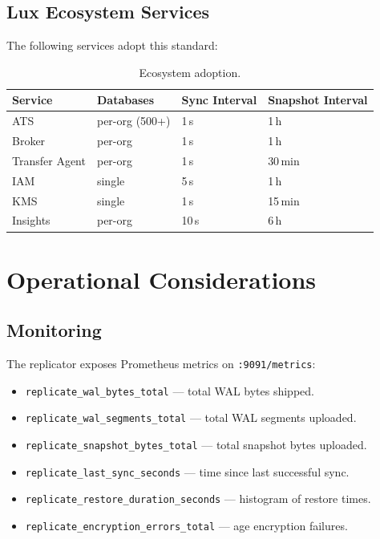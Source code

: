 \documentclass[11pt,a4paper]{article}
\begin{document}
\subsection{Lux Ecosystem Services}

The following services adopt this standard:

\begin{table}[H]
\centering
\caption{Ecosystem adoption.}
\label{tab:adoption}
\begin{tabular}{@{}llll@{}}
\toprule
\textbf{Service} & \textbf{Databases} & \textbf{Sync Interval} &
  \textbf{Snapshot Interval} \\
\midrule
ATS & per-org (500+) & 1\,s & 1\,h \\
Broker & per-org & 1\,s & 1\,h \\
Transfer Agent & per-org & 1\,s & 30\,min \\
IAM & single & 5\,s & 1\,h \\
KMS & single & 1\,s & 15\,min \\
Insights & per-org & 10\,s & 6\,h \\
\bottomrule
\end{tabular}
\end{table}

\section{Operational Considerations}\label{sec:ops}

\subsection{Monitoring}

The replicator exposes Prometheus metrics on \texttt{:9091/metrics}:

\begin{itemize}[nosep]
  \item \texttt{replicate\_wal\_bytes\_total} --- total WAL bytes shipped.
  \item \texttt{replicate\_wal\_segments\_total} --- total WAL segments
    uploaded.
  \item \texttt{replicate\_snapshot\_bytes\_total} --- total snapshot
    bytes uploaded.
  \item \texttt{replicate\_last\_sync\_seconds} --- time since last
    successful sync.
  \item \texttt{replicate\_restore\_duration\_seconds} --- histogram
    of restore times.
  \item \texttt{replicate\_encryption\_errors\_total} --- age
    encryption failures.
\end{itemize}
\end{document}
